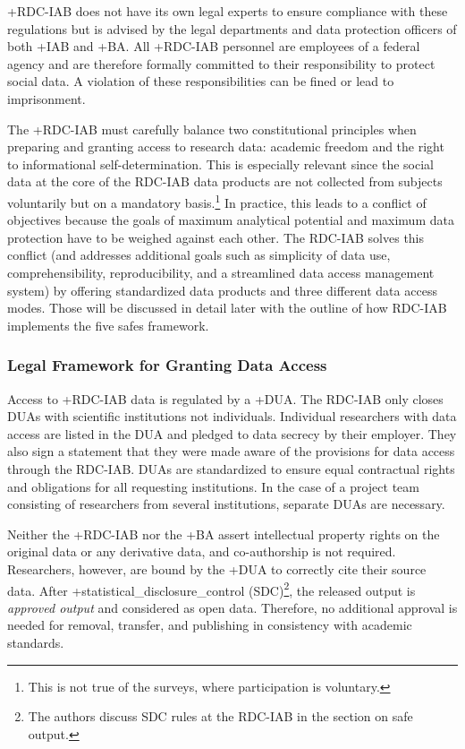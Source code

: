 \documentclass[
]{WileySix}
\begin{document}
+RDC-IAB\textbar{} does not have its own legal experts to ensure compliance with these regulations but is advised by the legal departments and data protection officers of both +IAB\textbar{} and +BA\textbar. All +RDC-IAB\textbar{} personnel are employees of a federal agency and are therefore formally committed to their responsibility to protect social data. A violation of these responsibilities can be fined or lead to imprisonment.

The +RDC-IAB\textbar{} must carefully balance two constitutional principles when preparing and granting access to research data: academic freedom and the right to informational self-determination. This is especially relevant since the social data at the core of the RDC-IAB data products are not collected from subjects voluntarily but on a mandatory basis.\footnote{This is not true of the surveys, where participation is voluntary.} In practice, this leads to a conflict of objectives because the goals of maximum analytical potential and maximum data protection have to be weighed against each other. The RDC-IAB solves this conflict (and addresses additional goals such as simplicity of data use, comprehensibility, reproducibility, and a streamlined data access management system) by offering standardized data products and three different data access modes. Those will be discussed in detail later with the outline of how RDC-IAB implements the five safes framework.

\hypertarget{legal-framework-for-granting-data-access}{%
\subsubsection{Legal Framework for Granting Data Access}\label{legal-framework-for-granting-data-access}}

Access to +RDC-IAB\textbar{} data is regulated by a +DUA\textbar. The RDC-IAB only closes DUAs with scientific institutions not individuals. Individual researchers with data access are listed in the DUA and pledged to data secrecy by their employer. They also sign a statement that they were made aware of the provisions for data access through the RDC-IAB. DUAs are standardized to ensure equal contractual rights and obligations for all requesting institutions. In the case of a project team consisting of researchers from several institutions, separate DUAs are necessary.

Neither the +RDC-IAB\textbar{} nor the +BA\textbar{} assert intellectual property rights on the original data or any derivative data, and co-authorship is not required. Researchers, however, are bound by the +DUA\textbar{} to correctly cite their source data. After +statistical\_disclosure\_control\textbar{} (SDC)\footnote{The authors discuss SDC rules at the RDC-IAB in the section on safe output.}, the released output is \emph{approved output} and considered as open data. Therefore, no additional approval is needed for removal, transfer, and publishing in consistency with academic standards.
\end{document}
